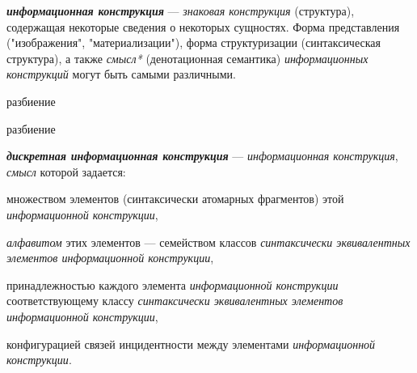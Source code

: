 \textbf{\textit{информационная конструкция}} --- \textit{знаковая конструкция} (структура), содержащая некоторые сведения о некоторых сущностях.
Форма представления ("изображения"{}, "материализации"{}), форма структуризации (синтаксическая структура), а также \textit{смысл*} (денотационная семантика) \textit{\textit{информационных конструкций}} могут быть самыми различными.

\begin{SCn}

    \begin{scnrelfromset}{разбиение}
            \begin{scnindent}
            \end{scnindent}
            \begin{scnindent}
            \begin{scnrelfromset}{разбиение}
            \end{scnrelfromset}
            \end{scnindent}
    \end{scnrelfromset}

\end{SCn}

\textbf{\textit{дискретная информационная конструкция}} --- \textit{информационная конструкция}, \textit{смысл} которой задается:
\begin{textitemize}
    \item множеством элементов (синтаксически атомарных фрагментов) этой \textit{информационной конструкции},
    \item \textit{алфавитом} этих элементов --- семейством классов \textit{синтаксически эквивалентных элементов информационной конструкции},
    \item принадлежностью каждого элемента \textit{информационной конструкции} соответствующему классу \textit{синтаксически эквивалентных элементов информационной конструкции},
    \item конфигурацией связей инцидентности между элементами \textit{информационной конструкции}.
\end{textitemize}

